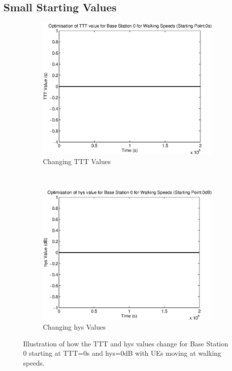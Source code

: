 \subsection{Small Starting Values}\label{ap:walk_low}
\begin{figure}[H]
        \centering
        \begin{subfigure}[b]{0.49\textwidth}
                \includegraphics[width=\textwidth]{figures/graphs/walklow/TTT0.eps}
                \caption{Changing TTT Values}
        \end{subfigure}%
        ~ %
        \begin{subfigure}[b]{0.49\textwidth}
                \includegraphics[width=\textwidth]{figures/graphs/walklow/hys0.eps}
                \caption{Changing hys Values}
        \end{subfigure}
        \caption{Illustration of how the TTT and hys values change for Base Station 0 starting at TTT=0s and hys=0dB with UEs moving at walking speeds.}
\end{figure}

